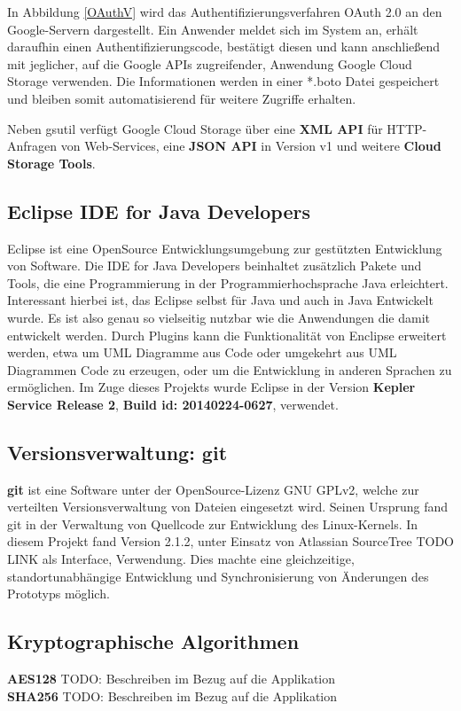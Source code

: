 \documentclass[12pt,a4paper,bibliography=totocnumbered,listof=totocnumbered]{scrartcl}
\begin{document}
In Abbildung \ref{OAuthV} wird das Authentifizierungsverfahren OAuth 2.0 an den Google-Servern dargestellt. Ein Anwender meldet sich im System an, erhält daraufhin einen Authentifizierungscode, bestätigt diesen und kann anschließend mit jeglicher, auf die Google APIs zugreifender, Anwendung Google Cloud Storage verwenden. Die Informationen werden in einer *.boto Datei gespeichert und bleiben somit automatisierend für weitere Zugriffe erhalten. \cite{46}

Neben gsutil verfügt Google Cloud Storage über eine \textbf{XML API} für HTTP-Anfragen von Web-Services, eine \textbf{JSON API} in Version v1 und weitere \textbf{Cloud Storage Tools}.

\subsection{Eclipse IDE for Java Developers}
Eclipse ist eine OpenSource Entwicklungsumgebung zur gestützten Entwicklung von Software. Die IDE for Java Developers beinhaltet zusätzlich Pakete und Tools, die eine Programmierung in der Programmierhochsprache Java erleichtert. Interessant hierbei ist, das Eclipse selbst für Java und auch in Java Entwickelt wurde. Es ist also genau so vielseitig nutzbar wie die Anwendungen die damit entwickelt werden. Durch Plugins kann die Funktionalität von Enclipse erweitert werden, etwa um UML Diagramme aus Code oder umgekehrt aus UML Diagrammen Code zu erzeugen, oder um die Entwicklung in anderen Sprachen zu ermöglichen. Im Zuge dieses Projekts wurde Eclipse in der Version \textbf{Kepler Service Release 2}, \textbf{Build id: 20140224-0627}, verwendet.

\subsection{Versionsverwaltung: git}
\textbf{git} ist eine Software unter der OpenSource-Lizenz GNU GPLv2, welche zur verteilten Versionsverwaltung von Dateien eingesetzt wird. Seinen Ursprung fand git in der Verwaltung von Quellcode zur Entwicklung des Linux-Kernels. In diesem Projekt fand Version 2.1.2, unter Einsatz von Atlassian SourceTree TODO LINK als Interface, Verwendung. Dies machte eine gleichzeitige, standortunabhängige Entwicklung und Synchronisierung von Änderungen des Prototyps möglich. \cite{31}

\subsection{Kryptographische Algorithmen}
\textbf{AES128}
TODO: Beschreiben im Bezug auf die Applikation
\\\textbf{SHA256}
TODO: Beschreiben im Bezug auf die Applikation
\end{document}
